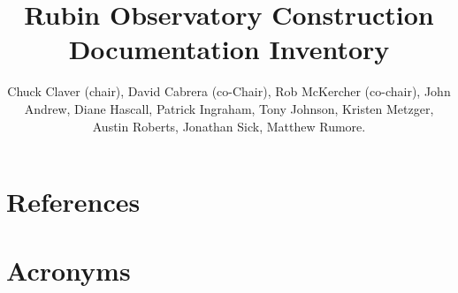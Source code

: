 \documentclass[SE,lsstdraft,authoryear,toc]{lsstdoc}
\title{Rubin Observatory Construction Documentation Inventory}
\author{%
Chuck Claver (chair),
David Cabrera (co-Chair),
Rob McKercher (co-chair),
John Andrew,
Diane Hascall,
Patrick Ingraham,
Tony Johnson,
Kristen Metzger,
Austin Roberts,
Jonathan Sick,
Matthew Rumore.
}
\date{\vcsDate}
\begin{document}
\maketitle












% 

\newpage
\appendix
\section{References} \label{sec:bib}
\renewcommand{\refname}{} %


\section{Acronyms} \label{sec:acronyms}

\end{document}
